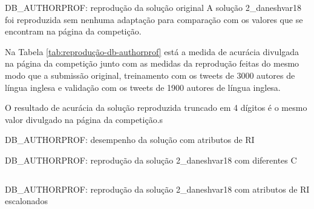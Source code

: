 \documentclass[%
  10pt,%
  aspectratio = 169,%
  compress,%
  t,%
]{beamer}%
\begin{document}
    \begin{frame}{}{DB\_AUTHORPROF: reprodução da solução original}
        A solução 2\_daneshvar18 foi reproduzida sem nenhuma adaptação para comparação com os valores que se encontram na página da competição.
        
        Na Tabela \ref{tab:reprodução-db-authorprof} está a medida de acurácia divulgada na página da competição \cite{PAN_APCLEF_2018} junto com as medidas da reprodução feitas do mesmo modo que a submissão original, treinamento com os tweets de 3000 autores de língua inglesa e validação com os tweets de 1900 autores de língua inglesa.
        
        

        O resultado de acurácia da solução reproduzida truncado em 4 dígitos é o mesmo valor divulgado na página da competição.s
    \end{frame}

    \begin{frame}{}{DB\_AUTHORPROF: desempenho da solução com atributos de RI}
        \vspace{-0.5cm}
        
    \end{frame}

    \begin{frame}{}{DB\_AUTHORPROF: reprodução da solução 2\_daneshvar18 com diferentes C}
        \begin{columns}[T]
                \vspace{-0.5cm}
                
                \vspace{-0.5cm}
                
        \end{columns}
    \end{frame}

    \begin{frame}{}{DB\_AUTHORPROF: reprodução da solução 2\_daneshvar18 com atributos de RI escalonados}
        \begin{columns}[T]
                \vspace{-0.5cm}
                
                \vspace{-0.5cm}
                
        \end{columns}
    \end{frame}
\end{document}
